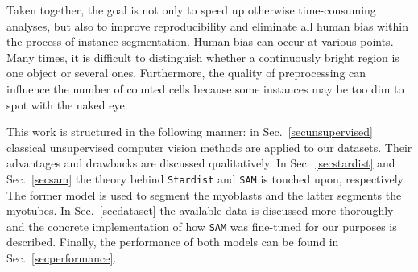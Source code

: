Taken together, the goal is not only to speed up otherwise time-consuming analyses, but also to improve reproducibility and eliminate all human bias within the process of instance segmentation. Human bias can occur at various points. Many times, it is difficult to distinguish whether a continuously bright region is one object or several ones. Furthermore, the quality of preprocessing can influence the number of counted cells because some instances may be too dim to spot with the naked eye.

This work is structured in the following manner: in Sec.~\ref{secunsupervised} classical unsupervised computer vision methods are applied to our datasets. Their advantages and drawbacks are discussed qualitatively. In Sec.~\ref{secstardist} and Sec.~\ref{secsam} the theory behind \texttt{Stardist} and \texttt{SAM} is touched upon, respectively. The former model is used to segment the myoblasts and the latter segments the myotubes. In Sec.~\ref{secdataset} the available data is discussed more thoroughly and the concrete implementation of how \texttt{SAM} was fine-tuned for our purposes is described. Finally, the performance of both models can be found in Sec.~\ref{secperformance}.
